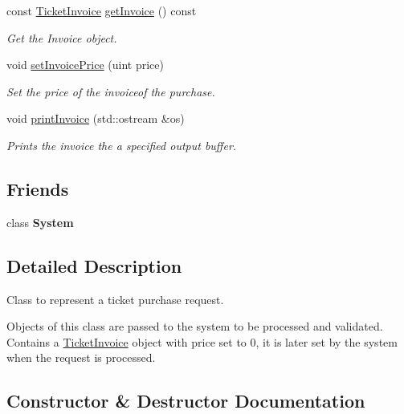 \begin{DoxyCompactItemize}
const \mbox{\hyperlink{classTicketInvoice}{Ticket\+Invoice}} \mbox{\hyperlink{classTicketPurchaseRequest_a24d2aab14853b8f7c8f5487145f3d26e}{get\+Invoice}} () const
\begin{DoxyCompactList}\small\item\em Get the Invoice object. \end{DoxyCompactList}\item 
void \mbox{\hyperlink{classTicketPurchaseRequest_a35b5d38bf3d6d00f90041762f2ca93ee}{set\+Invoice\+Price}} (uint price)
\begin{DoxyCompactList}\small\item\em Set the price of the invoiceof the purchase. \end{DoxyCompactList}\item 
void \mbox{\hyperlink{classTicketPurchaseRequest_a626107dad44c79663d318573e5c6bae2}{print\+Invoice}} (std\+::ostream \&os)
\begin{DoxyCompactList}\small\item\em Prints the invoice the a specified output buffer. \end{DoxyCompactList}\end{DoxyCompactItemize}
\subsection*{Friends}
\begin{DoxyCompactItemize}
\item 
\mbox{\label{classTicketPurchaseRequest_af18a9ee98e70982bfe2975391d7221a5}} 
class {\bfseries System}
\end{DoxyCompactItemize}


\subsection{Detailed Description}
Class to represent a ticket purchase request. 

Objects of this class are passed to the system to be processed and validated. Contains a \mbox{\hyperlink{classTicketInvoice}{Ticket\+Invoice}} object with price set to 0, it is later set by the system when the request is processed. 

\subsection{Constructor \& Destructor Documentation}
\mbox{\label{classTicketPurchaseRequest_aaa01be19b8a8ef88428f4d1dc3a3c63c}} 
